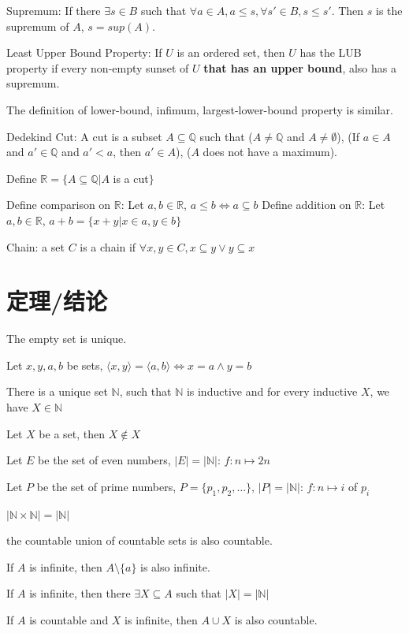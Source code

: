 \documentclass[12pt,a4paper]{ctexrep}
\begin{document}
Supremum: If there $\exists s \in B$ such that $\forall a \in A, a \leqslant s, \forall s' \in B, s \leqslant s'$. Then $s$ is the supremum of $A$, $s = sup(A)$.

Least Upper Bound Property: If $U$ is an ordered set, then $U$ has the LUB property if every non-empty sunset of $U$ \textbf{that has an upper bound}, also has a supremum.

The definition of lower-bound, infimum, largest-lower-bound property is similar.

Dedekind Cut: A cut is a subset $A \subseteq \mathbb{Q}$ such that ($A \neq \mathbb{Q}$ and $A \neq \emptyset$), (If $a \in A$ and $a' \in \mathbb{Q}$ and $a' < a$, then $a' \in A$), ($A$ does not have a maximum).

Define $\mathbb{R} = \{A \subseteq \mathbb{Q}|A$ is a cut$\}$

Define comparison on $\mathbb{R}$: Let $a,b \in \mathbb{R}$, $a \leqslant b \iff a \subseteq b$
Define addition on $\mathbb{R}$: Let $a,b \in \mathbb{R}$, $a+b = \{x+y|x \in a, y \in b\}$

Chain: a set $C$ is a chain if $\forall x,y \in C, x \subseteq y \vee y \subseteq x$
\section{定理/结论}
The empty set is unique.

Let $x,y,a,b$ be sets, $\langle x,y \rangle = \langle a,b \rangle \iff x=a \wedge y=b$

There is a unique set $\mathbb{N}$, such that $\mathbb{N}$ is inductive and for every inductive $X$, we have $X\in \mathbb{N}$

Let $X$ be a set, then $X \notin X$

Let $E$ be the set of even numbers, $|E|=|\mathbb{N}|$: $f:n\mapsto 2n$

Let $P$ be the set of prime numbers, $P=\{p_1,p_2,\dots\}$, $|P|=|\mathbb{N}|$: $f:n \mapsto i$ of $p_i$

$|\mathbb{N} \times \mathbb{N}| = |\mathbb{N}|$

the countable union of countable sets is also countable.

If $A$ is infinite, then $A\setminus \{a\}$ is also infinite.

If $A$ is infinite, then there $\exists X \subseteq A$ such that $|X| = |\mathbb{N}|$

If $A$ is countable and $X$ is infinite, then $A \cup X$ is also countable.\\
\end{document}
